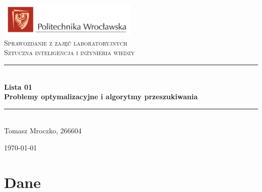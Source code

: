 \documentclass[a4paper, 12pt]{article}
\newcommand{\HRule}{\rule{\linewidth}{0.5mm}}
\begin{document}
\begin{titlepage}
  \begin{center}
    \includegraphics[width=0.5\textwidth]{images/logo.png}~\\[1cm]

    \textsc{Sprawozdanie z zajęć laboratoryjnych\\ Sztuczna inteligencja i inżynieria wiedzy\\[3cm]}


    \HRule \\[0.4cm]
    {\large \bfseries Lista 01 \\ Problemy optymalizacyjne i algorytmy przeszukiwania\\[0.4cm]}
    \HRule \\[8cm]


    Tomasz Mroczko, 266604 \\[3cm]

    \vfill

    {\today}

  \end{center}
\end{titlepage}


\newpage
\tableofcontents
\newpage


\section{Dane}
\end{document}
